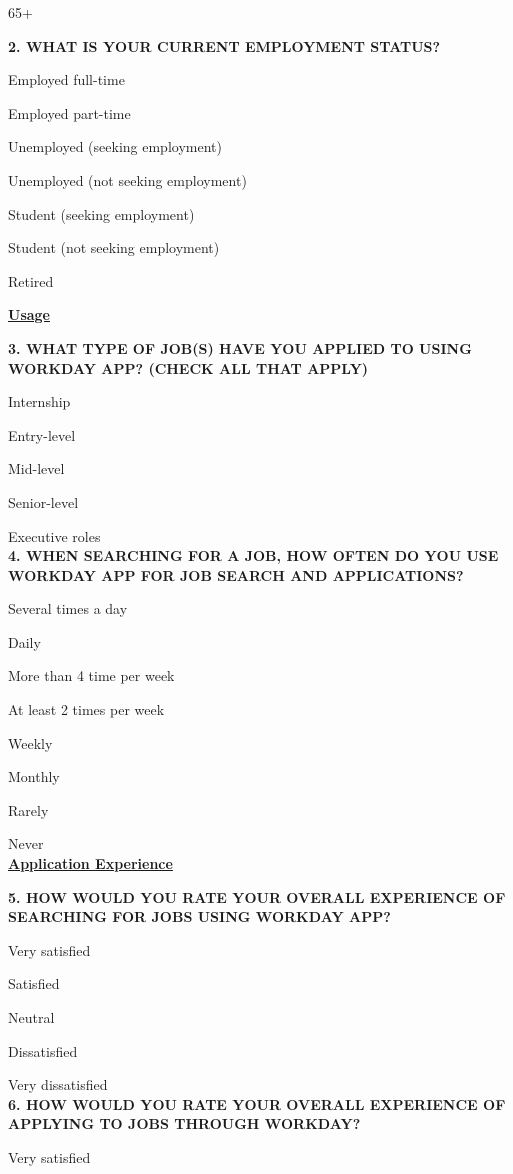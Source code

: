 \documentclass[
	letterpaper, %
]{jdf}
\begin{document}
65+

\hfill \break

\textbf{2. WHAT IS YOUR CURRENT EMPLOYMENT STATUS?}

Employed full-time

Employed part-time

Unemployed (seeking employment)

Unemployed (not seeking employment)

Student (seeking employment)

Student (not seeking employment)

Retired


\underline{\textbf{Usage  }}

\textbf{3. WHAT TYPE OF JOB(S) HAVE YOU APPLIED TO USING WORKDAY APP? (CHECK ALL THAT APPLY)
}

Internship

Entry-level

Mid-level

Senior-level

Executive roles \\



\textbf{4. WHEN SEARCHING FOR A JOB, HOW OFTEN DO YOU USE WORKDAY APP FOR JOB SEARCH AND APPLICATIONS?
}

Several times a day

Daily

More than 4 time per week

At least 2 times per week

Weekly

Monthly

Rarely

Never			
\\

\underline{\textbf{Application Experience  }}

\textbf{5. HOW WOULD YOU RATE YOUR OVERALL EXPERIENCE OF SEARCHING FOR JOBS  USING WORKDAY APP?}

Very satisfied

Satisfied

Neutral

Dissatisfied

Very dissatisfied \\



\textbf{6. HOW WOULD YOU RATE YOUR OVERALL EXPERIENCE OF APPLYING TO JOBS THROUGH WORKDAY?}

Very satisfied
\end{document}
